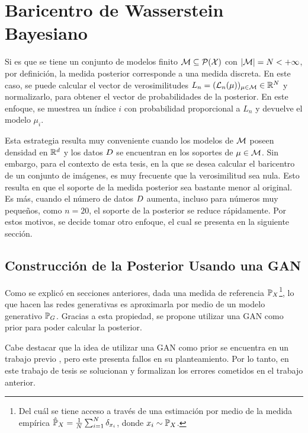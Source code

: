 \section{Baricentro de Wasserstein Bayesiano}\label{sec:bwb}  %


Si es que se tiene un conjunto de modelos finito $\Models \subseteq \ProbSpace[\cX] $ con $| \Models | = N < + \infty$, por definición, la medida posterior corresponde a una medida discreta. En este caso, se puede calcular el vector de verosimilitudes $L_n = (\cL_n(\mu))_{\mu \in \Models} \in \R^N$ y normalizarlo, para obtener el vector de probabilidades de la posterior. En este enfoque, se muestrea un índice $i$ con probabilidad proporcional a $L_n$ y devuelve el modelo $\mu_i$.

Esta estrategia resulta muy conveniente cuando los modelos de $\Manifold$ poseen densidad en $\R^d$ y los datos $\Data$ se encuentran en los soportes de $\mu\in \Manifold$. Sin embargo, para el contexto de esta tesis, en la que se desea calcular el baricentro de un conjunto de imágenes, es muy frecuente que la verosimilitud sea nula. Esto resulta en que el soporte de la medida posterior sea bastante menor al original. Es más, cuando el número de datos $\Data$ aumenta, incluso para números muy pequeños, como $n=20$, el soporte de la posterior se reduce rápidamente. Por estos motivos, se decide tomar otro enfoque, el cual se presenta en la siguiente sección.


\subsection{Construcción de la Posterior Usando una GAN}\label{ssec:construccion-posterior}  %

Como se explicó en secciones anteriores,
dada una medida de referencia $\Prob_X$\footnote{Del cuál se tiene acceso a través de una estimación por medio de la medida empírica $\hat\Prob_X = \frac{1}{N}\sum_{i=1}^{N} \delta_{x_i}$, donde $x_i \sim \Prob_X$.}, lo que hacen las redes generativas es aproximarla por medio de un modelo generativo $\Prob_G$. Gracias a esta propiedad, se propone utilizar una GAN como prior para poder calcular la posterior.

Cabe destacar que la idea de utilizar una GAN como prior se encuentra en un trabajo previo \cite{patel2019bayesian}, pero este presenta fallos en su planteamiento. Por lo tanto, en este trabajo de tesis se solucionan y formalizan los errores cometidos en el trabajo anterior.

